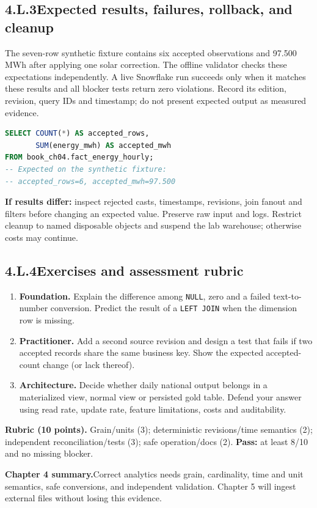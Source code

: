 \documentclass[11pt,twoside]{article}
\newcommand{\topic}[2]{\subsection*{#1\quad #2}}
\begin{document}
\newpage
\topic{4.L.3}{Expected results, failures, rollback, and cleanup}
The seven-row synthetic fixture contains six accepted observations and 97.500 MWh after applying one solar correction. The offline validator checks these expectations independently. A live Snowflake run succeeds only when it matches these results and all blocker tests return zero violations. Record its edition, revision, query IDs and timestamp; do not present expected output as measured evidence.

\begin{lstlisting}[language=SQL,caption={Acceptance checkpoint for the isolated Snowflake lab.}]
SELECT COUNT(*) AS accepted_rows,
       SUM(energy_mwh) AS accepted_mwh
FROM book_ch04.fact_energy_hourly;
-- Expected on the synthetic fixture:
-- accepted_rows=6, accepted_mwh=97.500
\end{lstlisting}
\textbf{If results differ:} inspect rejected casts, timestamps, revisions, join fanout and filters before changing an expected value. Preserve raw input and logs. Restrict cleanup to named disposable objects and suspend the lab warehouse; otherwise costs may continue.

\topic{4.L.4}{Exercises and assessment rubric}
\begin{enumerate}
\item \textbf{Foundation.} Explain the difference among \texttt{NULL}, zero and a failed text-to-number conversion. Predict the result of a \texttt{LEFT JOIN} when the dimension row is missing.
\item \textbf{Practitioner.} Add a second source revision and design a test that fails if two accepted records share the same business key. Show the expected accepted-count change (or lack thereof).
\item \textbf{Architecture.} Decide whether daily national output belongs in a materialized view, normal view or persisted gold table. Defend your answer using read rate, update rate, feature limitations, costs and auditability.
\end{enumerate}
\textbf{Rubric (10 points).} Grain/units (3); deterministic revisions/time semantics (2); independent reconciliation/tests (3); safe operation/docs (2). \textbf{Pass:} at least 8/10 and no missing blocker.

\begin{whitebox}\textbf{Chapter 4 summary.}\quad Correct analytics needs grain, cardinality, time and unit semantics, safe conversions, and independent validation. Chapter 5 will ingest external files without losing this evidence.\end{whitebox}
\end{document}
